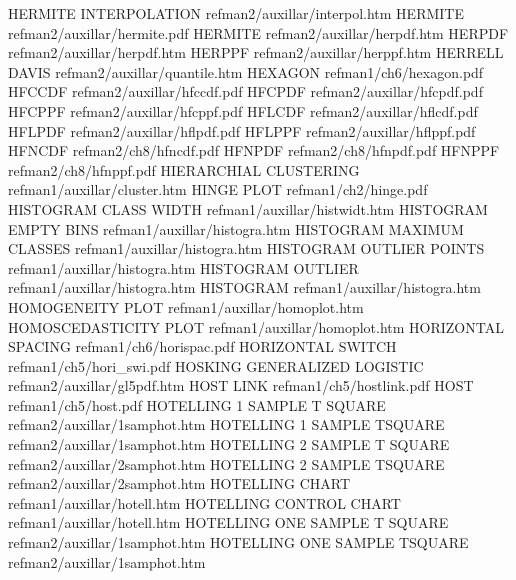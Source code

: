 HERMITE INTERPOLATION                   refman2/auxillar/interpol.htm
HERMITE                                 refman2/auxillar/hermite.pdf
HERMITE                                 refman2/auxillar/herpdf.htm
HERPDF                                  refman2/auxillar/herpdf.htm
HERPPF                                  refman2/auxillar/herppf.htm
HERRELL DAVIS                           refman2/auxillar/quantile.htm
HEXAGON                                 refman1/ch6/hexagon.pdf
HFCCDF                                  refman2/auxillar/hfccdf.pdf
HFCPDF                                  refman2/auxillar/hfcpdf.pdf
HFCPPF                                  refman2/auxillar/hfcppf.pdf
HFLCDF                                  refman2/auxillar/hflcdf.pdf
HFLPDF                                  refman2/auxillar/hflpdf.pdf
HFLPPF                                  refman2/auxillar/hflppf.pdf
HFNCDF                                  refman2/ch8/hfncdf.pdf
HFNPDF                                  refman2/ch8/hfnpdf.pdf
HFNPPF                                  refman2/ch8/hfnppf.pdf
HIERARCHIAL CLUSTERING                  refman1/auxillar/cluster.htm
HINGE PLOT                              refman1/ch2/hinge.pdf
HISTOGRAM CLASS WIDTH                   refman1/auxillar/histwidt.htm
HISTOGRAM EMPTY BINS                    refman1/auxillar/histogra.htm
HISTOGRAM MAXIMUM CLASSES               refman1/auxillar/histogra.htm
HISTOGRAM OUTLIER POINTS                refman1/auxillar/histogra.htm
HISTOGRAM OUTLIER                       refman1/auxillar/histogra.htm
HISTOGRAM                               refman1/auxillar/histogra.htm
HOMOGENEITY PLOT                        refman1/auxillar/homoplot.htm
HOMOSCEDASTICITY PLOT                   refman1/auxillar/homoplot.htm
HORIZONTAL SPACING                      refman1/ch6/horispac.pdf
HORIZONTAL SWITCH                       refman1/ch5/hori_swi.pdf
HOSKING GENERALIZED LOGISTIC            refman2/auxillar/gl5pdf.htm
HOST LINK                               refman1/ch5/hostlink.pdf
HOST                                    refman1/ch5/host.pdf
HOTELLING 1 SAMPLE T SQUARE             refman2/auxillar/1samphot.htm
HOTELLING 1 SAMPLE TSQUARE              refman2/auxillar/1samphot.htm
HOTELLING 2 SAMPLE T SQUARE             refman2/auxillar/2samphot.htm
HOTELLING 2 SAMPLE TSQUARE              refman2/auxillar/2samphot.htm
HOTELLING CHART                         refman1/auxillar/hotell.htm
HOTELLING CONTROL CHART                 refman1/auxillar/hotell.htm
HOTELLING ONE SAMPLE T SQUARE           refman2/auxillar/1samphot.htm
HOTELLING ONE SAMPLE TSQUARE            refman2/auxillar/1samphot.htm
